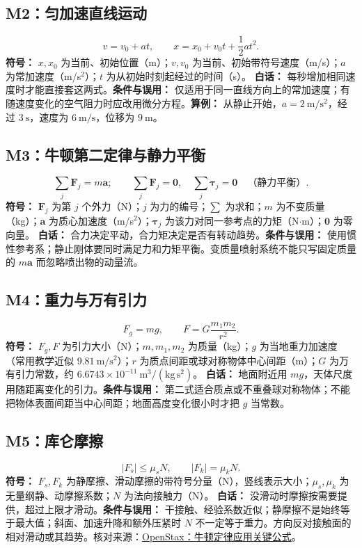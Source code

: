 \documentclass[UTF8,zihao=-4,openany,oneside,fontset=windows]{ctexbook}
\begin{document}
\subsection{M2：匀加速直线运动}
\begin{equation}
v=v_0+at,\qquad x=x_0+v_0t+\frac12at^2.
\end{equation}
\textbf{符号：} $x,x_0$ 为当前、初始位置（m）；$v,v_0$ 为当前、初始带符号速度（m/s）；$a$ 为常加速度（m/s$^2$）；$t$ 为从初始时刻起经过的时间（s）。
\textbf{白话：} 每秒增加相同速度时才能直接套这两式。\textbf{条件与误用：} 仅适用于同一直线方向上的常加速度；有随速度变化的空气阻力时应改用微分方程。\textbf{算例：} 从静止开始，$a=2\ \mathrm{m/s^2}$，经过 $3\ \mathrm{s}$，速度为 $6\ \mathrm{m/s}$，位移为 $9\ \mathrm m$。

\subsection{M3：牛顿第二定律与静力平衡}
\begin{equation}
\sum_j\mathbf F_j=m\mathbf a;\qquad \sum_j\mathbf F_j=\mathbf0,\quad \sum_j\boldsymbol\tau_j=\mathbf0\quad\text{（静力平衡）}.
\end{equation}
\textbf{符号：} $\mathbf F_j$ 为第 $j$ 个外力（N）；$j$ 为力的编号；$\sum$ 为求和；$m$ 为不变质量（kg）；$\mathbf a$ 为质心加速度（m/s$^2$）；$\boldsymbol\tau_j$ 为该力对同一参考点的力矩（N$\cdot$m）；$\mathbf0$ 为零向量。
\textbf{白话：} 合力决定平动，合力矩决定是否有转动趋势。\textbf{条件与误用：} 使用惯性参考系；静止刚体要同时满足力和力矩平衡。变质量喷射系统不能只写固定质量的 $m\mathbf a$ 而忽略喷出物的动量流。

\subsection{M4：重力与万有引力}
\begin{equation}
F_g=mg,\qquad F=G\frac{m_1m_2}{r^2}.
\end{equation}
\textbf{符号：} $F_g,F$ 为引力大小（N）；$m,m_1,m_2$ 为质量（kg）；$g$ 为当地重力加速度（常用教学近似 $9.81\ \mathrm{m/s^2}$）；$r$ 为质点间距或球对称物体中心间距（m）；$G$ 为万有引力常数，约 $6.6743\times10^{-11}\ \mathrm{m^3/(kg\,s^2)}$。
\textbf{白话：} 地面附近用 $mg$，天体尺度用随距离变化的引力。\textbf{条件与误用：} 第二式适合质点或不重叠球对称物体；不能把物体表面间距当中心间距；地面高度变化很小时才把 $g$ 当常数。

\subsection{M5：库仑摩擦}
\begin{equation}
|F_s|\leq\mu_sN,\qquad |F_k|=\mu_kN.
\end{equation}
\textbf{符号：} $F_s,F_k$ 为静摩擦、滑动摩擦的带符号分量（N），竖线表示大小；$\mu_s,\mu_k$ 为无量纲静、动摩擦系数；$N$ 为法向接触力（N）。
\textbf{白话：} 没滑动时摩擦按需要提供，超过上限才滑动。\textbf{条件与误用：} 干接触、经验系数近似；静摩擦不是始终等于最大值；斜面、加速升降和额外压紧时 $N$ 不一定等于重力。方向反对接触面的相对滑动或其趋势。核对来源：\href{https://openstax.org/books/university-physics-volume-1/pages/6-key-equations}{OpenStax：牛顿定律应用关键公式}。
\end{document}
